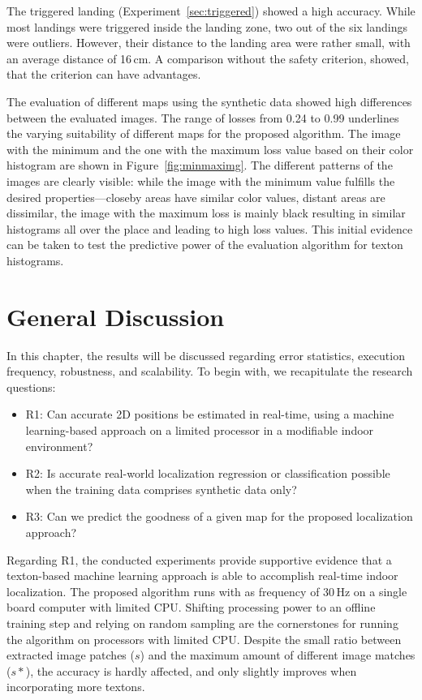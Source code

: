\documentclass[11pt]{report}
\begin{document}
The triggered landing (Experiment~\ref{sec:triggered}) showed a high
accuracy. While most landings were triggered inside the landing zone,
two out of the six landings were outliers. However, their distance to
the landing area were rather small, with an average distance of
16\,cm. A comparison without the safety criterion, showed, that the
criterion can have advantages.

The evaluation of different maps using the synthetic data showed high
differences between the evaluated images. The range of losses from
0.24 to 0.99 underlines the varying suitability of different maps for
the proposed algorithm.
The
image with the minimum and the one with the maximum loss value based
on their color histogram are shown in Figure~\ref{fig:minmaximg}. The
different patterns of the images are clearly visible: while the image
with the minimum value fulfills the desired properties---closeby areas
have similar color values, distant areas are dissimilar, the image
with the maximum loss is mainly black resulting in similar histograms
all over the place and leading to high loss values. This initial
evidence can be taken to test the predictive power of the evaluation
algorithm for texton histograms.

\section{General Discussion}
\label{sec:generaldiscussion}

In this chapter, the results will be discussed regarding error
statistics, execution frequency, robustness, and scalability. To begin
with, we recapitulate the research questions:

\begin{itemize}
\item R1: Can accurate 2D positions be estimated in real-time, using a
  machine learning-based approach on a limited processor in a
  modifiable indoor environment?
\item R2: Is accurate real-world localization regression or classification
  possible when the training data comprises synthetic data only?
\item R3: Can we predict the goodness of a given map for the proposed
  localization approach?
\end{itemize}

Regarding R1, the conducted experiments provide supportive evidence
that a texton-based machine learning approach is able to accomplish
real-time indoor localization. The proposed algorithm runs with as
frequency of 30\,Hz on a single board computer with limited
CPU. Shifting processing power to an offline training step and relying
on random sampling are the cornerstones for running the algorithm on
processors with limited CPU. Despite the small ratio between extracted
image patches ($s$) and the maximum amount of different image matches
($s*$), the accuracy is hardly affected, and only slightly improves
when incorporating more textons.
\end{document}
